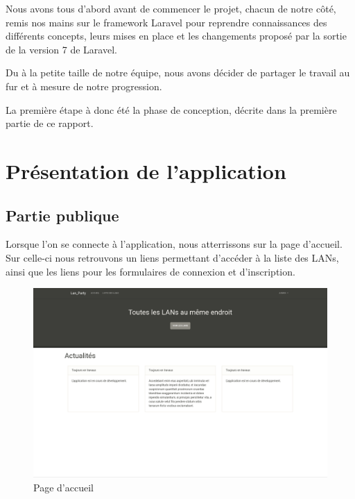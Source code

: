 \documentclass[12pt]{article}
\begin{document}
Nous avons tous d'abord avant de commencer le projet, chacun de notre côté, remis nos mains sur le framework
Laravel pour reprendre connaissances des différents concepts, leurs mises en place et les changements proposé par la sortie de la version 7 de Laravel.

Du à la petite taille de notre équipe, nous avons décider de partager le travail au fur et à mesure de notre progression. 

La première étape à donc été la phase de conception, décrite dans la première partie de ce rapport. 
\newpage

\section{Présentation de l'application}

\subsection{Partie publique}
Lorsque l'on se connecte à l'application, nous atterrissons sur la page d'accueil. Sur celle-ci nous retrouvons un liens permettant d'accéder à la liste des LANs, ainsi que les liens pour les formulaires de connexion et d'inscription.

\begin{figure}[H]
\centering
\includegraphics[scale=0.20]{images/accueil.png}
\caption{Page d'accueil}
\label{}
\end{figure}
\end{document}
